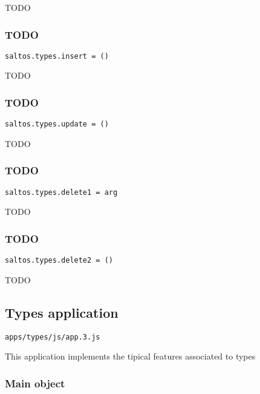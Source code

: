 \documentclass[a4paper]{article}
\begin{document}
TODO

\hypertarget{toc126}{}
\subsubsection{TODO}

\begin{lstlisting}
saltos.types.insert = ()
\end{lstlisting}

TODO

\hypertarget{toc127}{}
\subsubsection{TODO}

\begin{lstlisting}
saltos.types.update = ()
\end{lstlisting}

TODO

\hypertarget{toc128}{}
\subsubsection{TODO}

\begin{lstlisting}
saltos.types.delete1 = arg
\end{lstlisting}

TODO

\hypertarget{toc129}{}
\subsubsection{TODO}

\begin{lstlisting}
saltos.types.delete2 = ()
\end{lstlisting}

TODO

\hypertarget{toc130}{}
\subsection{Types application}

\begin{lstlisting}
apps/types/js/app.3.js
\end{lstlisting}

This application implements the tipical features associated to types

\hypertarget{toc131}{}
\subsubsection{Main object}
\end{document}
